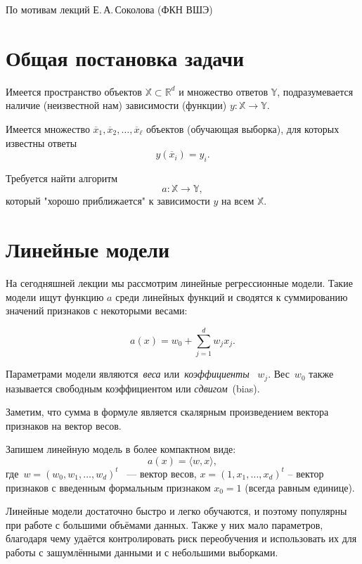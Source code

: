 \documentclass[12pt,fleqn]{article}
\begin{document}

По мотивам лекций Е.\,А.\,Соколова (ФКН ВШЭ)

\section{Общая постановка задачи} 

Имеется пространство объектов $\mathbb{X} \subset \mathbb{R}^d$ и множество ответов $\mathbb{Y}$, подразумевается наличие (неизвестной нам) зависимости (функции) $y: \mathbb{X} \to \mathbb{Y}$. 

Имеется множество $\overline{x}_1, \overline{x}_2, \ldots, \overline{x}_\ell$ объектов (обучающая выборка), для которых известны ответы $$y(\overline{x}_i)=y_i.$$  

Требуется найти алгоритм $$a : \mathbb{X} \to \mathbb{Y},$$ который "хорошо приближается" к зависимости $y$ на всем $ \mathbb{X}$.  

\section{Линейные модели}

На сегодняшней лекции мы рассмотрим линейные регрессионные модели.  Такие модели ищут функцию $a$ среди линейных функций и сводятся к суммированию значений признаков с некоторыми весами:

$$
    a(x)
    =
    w_0
    +
    \sum_{j = 1}^{d}
        w_j x_j.
$$ 

Параметрами модели являются~\emph{веса} или~\emph{коэффициенты}~ $w_j$.
Вес~$w_0$ также называется свободным коэффициентом или \emph{сдвигом}~(bias).

Заметим, что сумма в формуле является скалярным произведением вектора признаков на вектор весов.

Запишем линейную модель в более компактном виде:
$$
    a(x)
    =
    \langle w, x \rangle,
$$
где~$w = (w_0, w_1, \dots, w_d)^t$~ --- вектор весов, $x=(1, x_1, \ldots, x_d)^t$ -- вектор признаков с введенным формальным признаком $x_0=1$ (всегда равным единице).


Линейные модели достаточно быстро и легко обучаются, и поэтому популярны при работе с большими объёмами данных. Также у них мало параметров, благодаря чему удаётся контролировать риск переобучения и использовать их для работы с зашумлёнными данными и с небольшими выборками.
\end{document}
